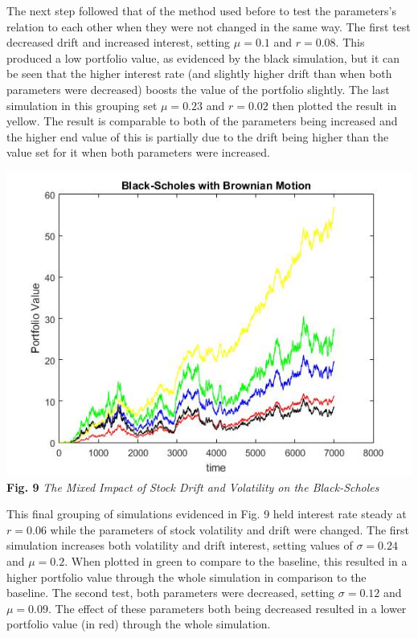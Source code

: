 \documentclass{report}
\begin{document}
	The next step followed that of the method used before to test the parameters's relation to each other when they were not changed in the same way. The first test decreased drift and increased interest, setting $\mu = 0.1$ and $r =0.08$. This produced a low portfolio value, as evidenced by the black simulation, but it can be seen that the higher interest rate (and slightly higher drift than when both parameters were decreased) boosts the value of the portfolio slightly. The last simulation in this grouping set $\mu = 0.23$ and $r=0.02$ then plotted the result in yellow. The result is comparable to both of the parameters being increased and the higher end value of this is partially due to the drift being higher than the value set for it when both parameters were increased.
	\begin{center}
		\includegraphics[scale=0.4]{vdimpact}
		\\ \textbf{Fig. 9} \textit{The Mixed Impact of Stock Drift and Volatility on the Black-Scholes}
	\end{center}
	
	This final grouping of simulations evidenced in Fig. 9 held interest rate steady at $r = 0.06$ while the parameters of stock volatility and drift were changed. The first simulation increases both volatility and drift interest, setting values of $\sigma = 0.24$ and $\mu = 0.2$. When plotted in green to compare to the baseline, this resulted in a higher portfolio value through the whole simulation in comparison to the baseline. The second test, both parameters were decreased, setting $\sigma = 0.12$ and $\mu=0.09$. The effect of these parameters both being decreased resulted in a lower portfolio value (in red) through the whole simulation.\\
	
\end{document}
